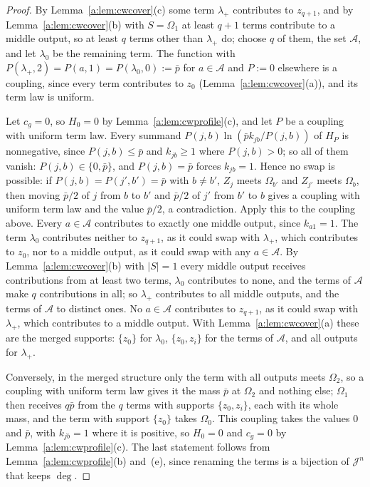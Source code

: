 \documentclass[11pt]{article}
\theoremstyle{definition}
\theoremstyle{remark}
\begin{document}
\begin{proof}
By Lemma~\ref{a:lem:cwcover}(c) some term $\lambda_+$ contributes to $z_{q+1}$, and by Lemma~\ref{a:lem:cwcover}(b) with $S=\Omega_1$ at least $q+1$ terms contribute to a middle output, so at least $q$ terms other than $\lambda_+$ do; choose $q$ of them, the set $\mathcal A$, and let $\lambda_0$ be the remaining term. The function with $P(\lambda_+,2)=P(a,1)=P(\lambda_0,0):=\bar p$ for $a\in\mathcal A$ and $P:=0$ elsewhere is a coupling, since every term contributes to $z_0$ (Lemma~\ref{a:lem:cwcover}(a)), and its term law is uniform.

Let $c_g=0$, so $H_0=0$ by Lemma~\ref{a:lem:cwprofile}(c), and let $P$ be a coupling with uniform term law. Every summand $P(j,b)\ln(\bar pk_{jb}/P(j,b))$ of $H_P$ is nonnegative, since $P(j,b)\le\bar p$ and $k_{jb}\ge1$ where $P(j,b)>0$; so all of them vanish: $P(j,b)\in\{0,\bar p\}$, and $P(j,b)=\bar p$ forces $k_{jb}=1$. Hence no swap is possible: if $P(j,b)=P(j',b')=\bar p$ with $b\ne b'$, $Z_j$ meets $\Omega_{b'}$ and $Z_{j'}$ meets $\Omega_b$, then moving $\bar p/2$ of $j$ from $b$ to $b'$ and $\bar p/2$ of $j'$ from $b'$ to $b$ gives a coupling with uniform term law and the value $\bar p/2$, a contradiction. Apply this to the coupling above. Every $a\in\mathcal A$ contributes to exactly one middle output, since $k_{a1}=1$. The term $\lambda_0$ contributes neither to $z_{q+1}$, as it could swap with $\lambda_+$, which contributes to $z_0$, nor to a middle output, as it could swap with any $a\in\mathcal A$. By Lemma~\ref{a:lem:cwcover}(b) with $|S|=1$ every middle output receives contributions from at least two terms, $\lambda_0$ contributes to none, and the terms of $\mathcal A$ make $q$ contributions in all; so $\lambda_+$ contributes to all middle outputs, and the terms of $\mathcal A$ to distinct ones. No $a\in\mathcal A$ contributes to $z_{q+1}$, as it could swap with $\lambda_+$, which contributes to a middle output. With Lemma~\ref{a:lem:cwcover}(a) these are the merged supports: $\{z_0\}$ for $\lambda_0$, $\{z_0,z_i\}$ for the terms of $\mathcal A$, and all outputs for $\lambda_+$.

Conversely, in the merged structure only the term with all outputs meets $\Omega_2$, so a coupling with uniform term law gives it the mass $\bar p$ at $\Omega_2$ and nothing else; $\Omega_1$ then receives $q\bar p$ from the $q$ terms with supports $\{z_0,z_i\}$, each with its whole mass, and the term with support $\{z_0\}$ takes $\Omega_0$. This coupling takes the values $0$ and $\bar p$, with $k_{jb}=1$ where it is positive, so $H_0=0$ and $c_g=0$ by Lemma~\ref{a:lem:cwprofile}(c). The last statement follows from Lemma~\ref{a:lem:cwprofile}(b) and~(e), since renaming the terms is a bijection of $\mathcal J^n$ that keeps $\deg$.
\end{proof}
\end{document}
